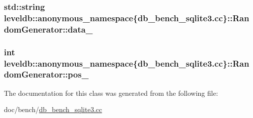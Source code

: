 \subsubsection[{data\+\_\+}]{\setlength{\rightskip}{0pt plus 5cm}std\+::string leveldb\+::anonymous\+\_\+namespace\{db\+\_\+bench\+\_\+sqlite3.\+cc\}\+::Random\+Generator\+::data\+\_\+\hspace{0.3cm}{\ttfamily [private]}}\label{classleveldb_1_1anonymous__namespace_02db__bench__sqlite3_8cc_03_1_1_random_generator_a9a2bebd9ca0d238c5c3cd87d0822bc72}
\hypertarget{classleveldb_1_1anonymous__namespace_02db__bench__sqlite3_8cc_03_1_1_random_generator_a981f5a44c475f9cb51e9e9cabe216311}{}
\subsubsection[{pos\+\_\+}]{\setlength{\rightskip}{0pt plus 5cm}int leveldb\+::anonymous\+\_\+namespace\{db\+\_\+bench\+\_\+sqlite3.\+cc\}\+::Random\+Generator\+::pos\+\_\+\hspace{0.3cm}{\ttfamily [private]}}\label{classleveldb_1_1anonymous__namespace_02db__bench__sqlite3_8cc_03_1_1_random_generator_a981f5a44c475f9cb51e9e9cabe216311}


The documentation for this class was generated from the following file\+:\begin{DoxyCompactItemize}
\item 
doc/bench/\hyperlink{db__bench__sqlite3_8cc}{db\+\_\+bench\+\_\+sqlite3.\+cc}\end{DoxyCompactItemize}
